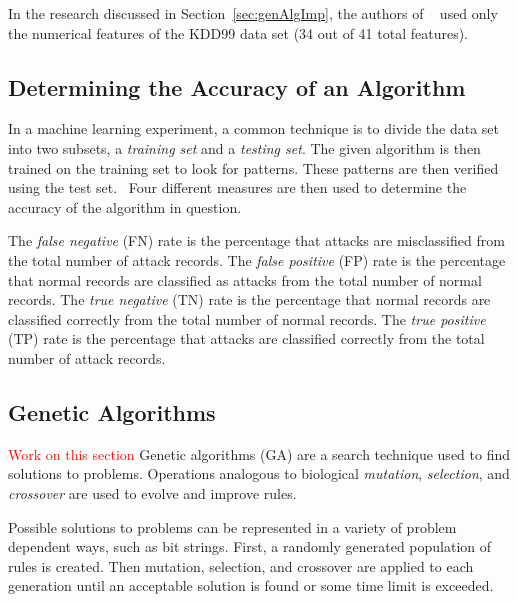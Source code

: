 \documentclass{sig-alternate}
\newcommand{\mycomment}[1]{\textcolor{red}{#1}}
\begin{document}
In the research discussed in Section~\ref{sec:genAlgImp}, the authors of ~\cite{DBLP:journals/corr/abs-1204-1336} used only the numerical features of the KDD99 data set (34 out of 41 total features).




\subsection{Determining the Accuracy of an Algorithm}
\label{sec:PosNeg}
In a machine learning experiment, a common technique is to divide the data set into two subsets, a \emph{training set} and a \emph{testing set}. The given algorithm is then trained on the training set to look for patterns. These patterns are then verified using the test set.~\cite{bc1_ecindm} Four different measures are then used to determine the accuracy of the algorithm in question.

The \emph{false negative} (FN) rate is the percentage that attacks are misclassified from the total number of attack records. The \emph{false positive} (FP) rate is the percentage that normal records are classified as attacks from the total number of normal records. The \emph{true negative} (TN) rate is the percentage that normal records are classified correctly from the total number of normal records. The \emph{true positive} (TP) rate is the percentage that attacks are classified correctly from the total number of attack records.~\cite{6496342, bc1_ecindm}






\subsection{Genetic Algorithms}
\label{sec:GA}
\mycomment{Work on this section} Genetic algorithms (GA) are a search technique used to find solutions to problems. Operations analogous to biological \emph{mutation}, \emph{selection}, and \emph{crossover} are used to evolve and improve rules.

Possible solutions to problems can be represented in a variety of problem dependent ways, such as bit strings. First, a randomly generated population of rules is created. Then mutation, selection, and crossover are applied to each generation until an acceptable solution is found or some time limit is exceeded.
\end{document}

